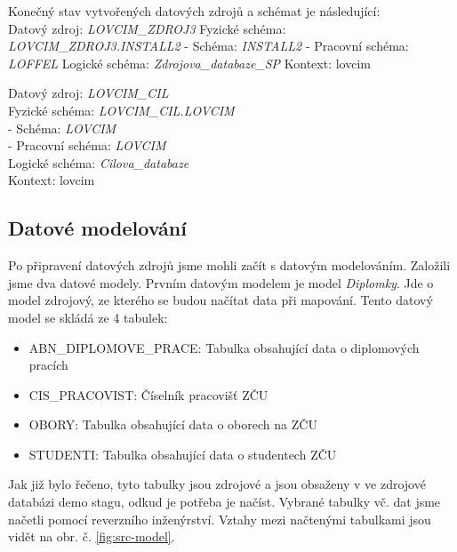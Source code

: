  \par Konečný stav vytvořených datových zdrojů a schémat je následující: \\

Datový zdroj: \textit{LOVCIM\_ZDROJ3} \newline
Fyzické schéma: \textit{LOVCIM\_ZDROJ3.INSTALL2}\newline
- Schéma: \textit{INSTALL2}\newline
- Pracovní schéma: \textit{LOFFEL}\newline
Logické schéma: \textit{Zdrojova\_databaze\_SP}\newline
Kontext: lovcim \newline

Datový zdroj: \textit{LOVCIM\_CIL}\\
Fyzické schéma: \textit{LOVCIM\_CIL.LOVCIM}\\
- Schéma: \textit{LOVCIM}\\
- Pracovní schéma: \textit{LOVCIM}\\
Logické schéma: \textit{Cilova\_databaze}\\
Kontext: lovcim\\
 
 
\subsection{Datové modelování}
 \par Po připravení datových zdrojů jsme mohli začít s datovým modelováním. Založili jsme dva datové modely. Prvním datovým modelem je model \textit{Diplomky}. Jde o model zdrojový, ze kterého se budou načítat data při mapování. Tento datový model se skládá ze 4 tabulek: 
\begin{itemize}
    \item ABN\_DIPLOMOVE\_PRACE: Tabulka obsahující data o diplomových pracích
    \item CIS\_PRACOVIST: Číselník pracovišť ZČU
    \item OBORY: Tabulka obsahující data o oborech na ZČU 
    \item STUDENTI: Tabulka obsahující data o studentech ZČU
\end{itemize}

Jak již bylo řečeno, tyto tabulky jsou zdrojové a jsou obsaženy v ve zdrojové databázi demo stagu, odkud je potřeba je načíst. Vybrané tabulky vč. dat jsme načetli pomocí reverzního inženýrství. Vztahy mezi načtenými tabulkami jsou vidět na obr. č. \ref{fig:src-model}. 

